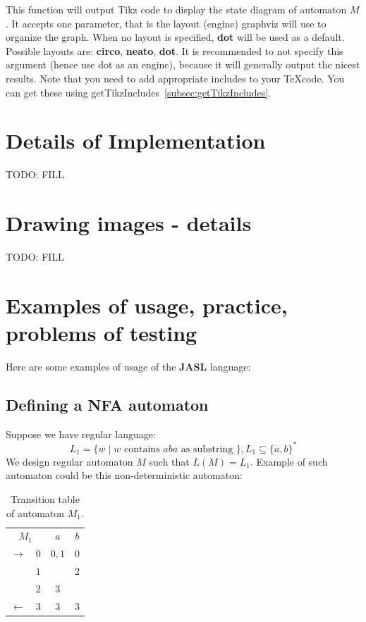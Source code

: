 \documentclass{ctuthesis}
\begin{document}
This function will output Tikz code to display the state diagram of automaton $M$. It accepts one parameter, that is the layout (engine) graphviz will use to organize the graph. When no layout is specified, \textbf{dot} will be used as a default. Possible layouts are: \textbf{circo}, \textbf{neato}, \textbf{dot}. It is recommended to not specify this argument (hence use dot as an engine), because it will generally output the nicest results. Note that you need to add appropriate includes to your \TeX code. You can get these using getTikzIncludes~\ref{subsec:getTikzIncludes}.

\chapter{Details of Implementation}
TODO: FILL

\chapter{Drawing images - details}
TODO: FILL

\chapter{Examples of usage, practice, problems of testing}
Here are some examples of usage of the \textbf{JASL} language: 

\section{Defining a NFA automaton}
\label{sec:example_NFA}
Suppose we have regular language: 
\begin{equation*}
L_1 = \{w \mid w \text{ contains } aba \text{ as substring }\}, L_1 \subseteq \{a, b\}^*
\end{equation*} 
We design regular automaton $M$ such that $L(M) = L_1$. Example of such automaton could be this non-deterministic automaton:
\begin{table}[H]
\begin{ctucolortab}
\begin{tabular}{cc|cc}
\multicolumn{2}{c}{\bfseries $M_1$} & \bfseries $a$ & \bfseries $b$ \\\Midrule
$\rightarrow$ 	& $0$ & $0,1$ 	& $0$  \\
				& $1$ &  	& $2$  \\
				& $2$ & $3$		&  \\
$\leftarrow$	& $3$ & $3$		& $3$ 
\end{tabular}
\end{ctucolortab}
\caption{Transition table of automaton $M_1$.}
\label{fig:examples_NFA_table}
\end{table} 
\end{document}
